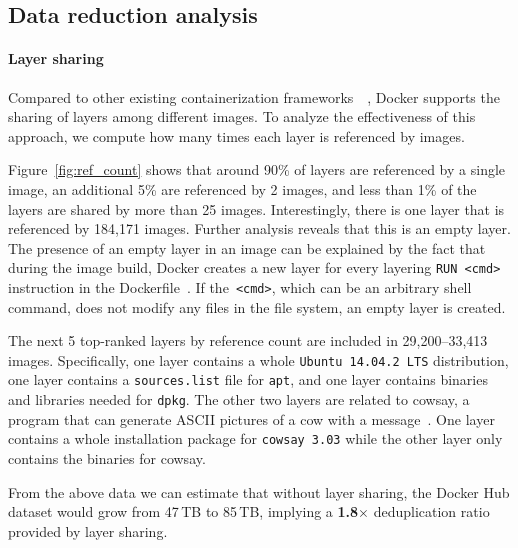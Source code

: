 \subsection{Data reduction analysis} 
\label{sec:dedup_ratio}

\paragraph{Layer sharing}

%
%
Compared to other existing containerization frameworks~\cite{openvz}~\cite{singularity},
Docker supports the sharing of layers among different images.
%
To analyze the effectiveness of this approach, we compute how many times
each layer is referenced by images.

Figure~\ref{fig:ref_count} shows that around 90\% of layers are referenced by
a single image, an additional 5\% are referenced by 2 images, and less than
1\% of the layers are shared by more than 25 images.
%
Interestingly, there is one layer that is referenced by 184,171 images.
Further analysis reveals that this is an empty layer.
%
The presence of an empty layer in an image can be explained
by the fact that during the image build, Docker creates a new layer
for every layering \texttt{RUN <cmd>} instruction
in the Dockerfile~\cite{Dockerfile}.
%
If the~\texttt{<cmd>}, which can be an arbitrary shell command,
does not modify any files in the file system,
an empty layer is created.
%

The next 5 top-ranked layers by reference count
are included in 29,200--33,413 images.
Specifically, one layer contains a whole \texttt{Ubuntu 14.04.2 LTS} distribution,
one layer contains a \texttt{sources.list} file for \texttt{apt},
and one layer contains binaries and libraries needed for \texttt{dpkg}.
The other two layers are related to cowsay, a program that can generate ASCII pictures of a cow with a message~\cite{cowsay}.
One layer contains a whole installation package for \texttt{cowsay 3.03} 
while the other layer only contains the binaries for cowsay.

From the above data we can estimate that without layer sharing, the Docker Hub
dataset would grow from 47\,TB to 85\,TB, implying a \textbf{1.8$\times$} deduplication
ratio provided by layer sharing.
 
